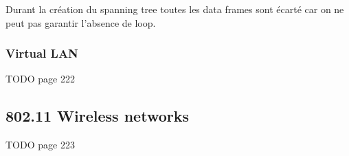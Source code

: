 \documentclass{report}
\begin{document}
Durant la création du spanning tree toutes les data frames sont écarté 
car on ne peut pas garantir l'absence de loop.


\subsubsection{Virtual LAN}

TODO page 222

\subsection{802.11 Wireless networks}

TODO page 223
\end{document}
